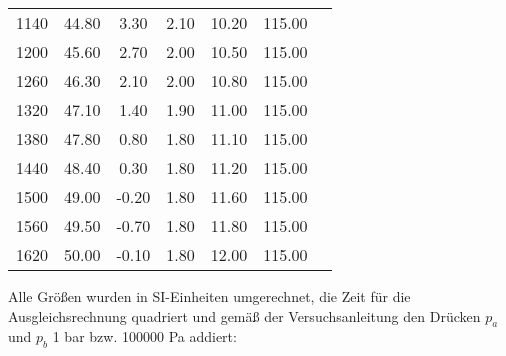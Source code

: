 \begin{table}
\begin{tabular}{c c c c c c c}
    1140 &    44.80 &      3.30 &       2.10 &      10.20 & 115.00 \\
    1200 &    45.60 &      2.70 &       2.00 &      10.50 & 115.00 \\
    1260 &    46.30 &      2.10 &       2.00 &      10.80 & 115.00 \\
    1320 &    47.10 &      1.40 &       1.90 &      11.00 & 115.00 \\
    1380 &    47.80 &      0.80 &       1.80 &      11.10 & 115.00 \\
    1440 &    48.40 &      0.30 &       1.80 &      11.20 & 115.00 \\
    1500 &    49.00 &     -0.20 &       1.80 &      11.60 & 115.00 \\
    1560 &    49.50 &     -0.70 &       1.80 &      11.80 & 115.00 \\
    1620 &    50.00 &     -0.10 &       1.80 &      12.00 & 115.00 \\
    \bottomrule
  \end{tabular}
\end{table}

\newpage
Alle Größen wurden in SI-Einheiten umgerechnet, die Zeit für die Ausgleichsrechnung quadriert und gemäß der Versuchsanleitung \cite{v206} den Drücken $\textit{p}_\textit{a}$ und $\textit{p}_\textit{b}$ 1 bar bzw. 100000 Pa addiert:

